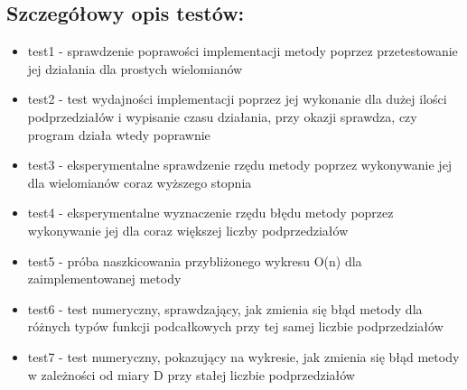 \documentclass[12pt]{article}
\begin{document}
\subsection{Szczegółowy opis testów:}
\begin{itemize}
\item{test1 - sprawdzenie poprawości implementacji metody poprzez przetestowanie jej działania dla prostych wielomianów}
\item{test2 - test wydajności implementacji poprzez jej wykonanie dla dużej ilości podprzedziałów i wypisanie czasu działania, przy okazji sprawdza, czy program działa wtedy poprawnie}
\item{test3 - eksperymentalne sprawdzenie rzędu metody poprzez wykonywanie jej dla wielomianów coraz wyższego stopnia}
\item{test4 - eksperymentalne wyznaczenie rzędu błędu metody poprzez wykonywanie jej dla coraz większej liczby podprzedziałów}
\item{test5 - próba naszkicowania przybliżonego wykresu O(n) dla zaimplementowanej metody}
\item{test6 - test numeryczny, sprawdzający, jak zmienia się błąd metody dla różnych typów funkcji podcałkowych przy tej samej liczbie podprzedziałów}
\item{test7 - test numeryczny, pokazujący na wykresie, jak zmienia się błąd metody w zależności od miary D przy stałej liczbie podprzedziałów}
\end{itemize}
\end{document}
